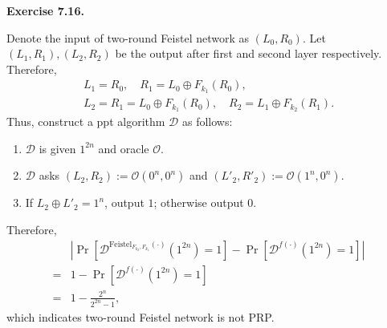\documentclass[a4paper]{article}
\newenvironment{exercise}[1]{
	\par
	\noindent\textbf{Exercise #1.}\quad
}{
	\par
	\bigskip
}
\newcommand{\abs}[1]{\left| #1 \right|}
\newcommand{\sbra}[1]{\left[ #1 \right]}
\newcommand{\Feistel}{\mathrm{Feistel}}
\newcommand{\ppt}{{\sc ppt} }
\newcommand{\Ocal}{\mathcal{O}}
\newcommand{\Dcal}{\mathcal{D}}
\begin{document}
\begin{exercise}{7.16}
    Denote the input of two-round Feistel network as $(L_0,R_0)$.
    Let $(L_1,R_1),(L_2,R_2)$ be the output after first and second layer respectively.
    Therefore, 
    \begin{gather*}
        L_1=R_0,\quad R_1=L_0\oplus F_{k_1}(R_0),\\
        L_2=R_1=L_0\oplus F_{k_1}(R_0),\quad R_2=L_1\oplus F_{k_2}(R_1).
    \end{gather*}
    Thus, construct a \ppt algorithm $\Dcal$ as follows:
    \begin{enumerate}
        \item $\Dcal$ is given $1^{2n}$ and oracle $\Ocal$.
        \item $\Dcal$ asks $(L_2,R_2):=\Ocal(0^n,0^n)$ 
            and $(L'_2,R'_2):=\Ocal(1^n,0^n)$.
        \item If $L_2\oplus L'_2=1^n$, output $1$; otherwise output $0$.
    \end{enumerate}
    Therefore,
    \begin{align*}
        &\abs{\Pr\sbra{\Dcal^{\Feistel_{F_{k_2},F_{k_1}}(\cdot)}(1^{2n})=1}-\Pr\sbra{\Dcal^{f(\cdot)}(1^{2n})=1}}\\
        =&1-\Pr\sbra{\Dcal^{f(\cdot)}(1^{2n})=1}\\
        =&1-\frac{2^n}{2^{2n}-1},
    \end{align*}
    which indicates two-round Feistel network is not PRP.
\end{exercise}
\end{document}
